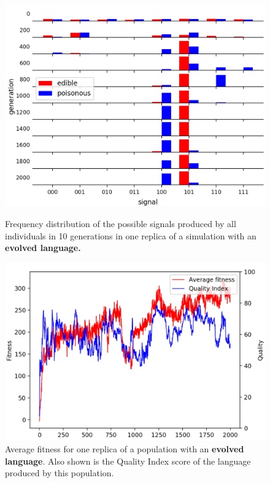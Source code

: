 \documentclass[12pt,a4paper]{report}
\begin{document}
\begin{figure}[t]
   \centering
   \begin{minipage}{0.49\textwidth}
          \centering
          \captionsetup{width=.9\linewidth}
          \includegraphics[width=1.\linewidth]{results/language.png}
          \caption{Frequency distribution of the possible signals produced by all individuals in 10 generations in one replica of a simulation with an \bf{evolved language}.}
          \label{fig:language-evolved3}
   \end{minipage}
   \begin{minipage}{0.49\textwidth}
          \centering
          \captionsetup{width=.9\linewidth}
          \includegraphics[width=1.\linewidth]{results/correlation.png}
          \caption{Average fitness for one replica of a population with an {\bf evolved language}. Also shown is the Quality Index score of the language produced by this population.}
          \label{fig:correlation}
   \end{minipage}
\end{figure}
\end{document}
